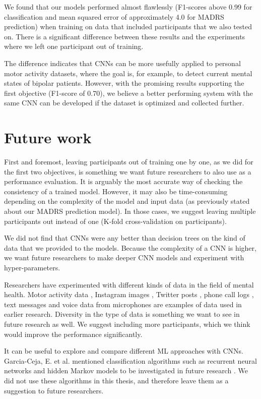 We found that our models performed almost flawlessly (F1-scores above 0.99 for classification and mean squared error of approximately 4.0 for MADRS prediction) when training on data that included participants that we also tested on. There is a significant difference between these results and the experiments where we left one participant out of training. 

The difference indicates that CNNs can be more usefully applied to personal motor activity datasets, where the goal is, for example, to detect current mental states of bipolar patients. However, with the promising results supporting the first objective (F1-score of 0.70), we believe a better performing system with the same CNN can be developed if the dataset is optimized and collected further.

\section{Future work}
First and foremost, leaving participants out of training one by one, as we did for the first two objectives, is something we want future researchers to also use as a performance evaluation. It is arguably the most accurate way of checking the consistency of a trained model. However, it may also be time-consuming depending on the complexity of the model and input data (as previously stated about our MADRS prediction model). In those cases, we suggest leaving multiple participants out instead of one (K-fold cross-validation on participants).

We did not find that CNNs were any better than decision trees on the kind of data that we provided to the models. Because the complexity of a CNN is higher, we want future researchers to make deeper CNN models and experiment with hyper-parameters. 

Researchers have experimented with different kinds of data in the field of mental health. Motor activity data \cite{obrien_depression, GarciaCeja2018_classification_bipolar}, Instagram images \cite{instagram_depression}, Twitter posts \cite{twitter_depression}, phone call logs \cite{faurholt_smartphone_bipolar, grunerbl_smartphone_bipolar}, text messages and voice data from microphones \cite{grunerbl_smartphone_bipolar} are examples of data used in earlier research. Diversity in the type of data is something we want to see in future research as well. We suggest including more participants, which we think would improve the performance significantly.

It can be useful to explore and compare different ML approaches with CNNs. Garcia-Ceja, E. et al. mentioned classification algorithms such as recurrent neural networks and hidden Markov models to be investigated in future research \cite{GarciaCeja2018_classification_bipolar}. We did not use these algorithms in this thesis, and therefore leave them as a suggestion to future researchers. 
